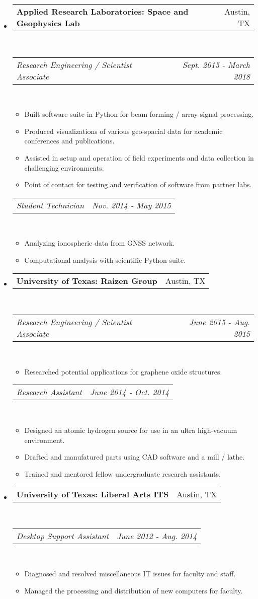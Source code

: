 \documentclass{article}
\makeatletter
\newcommand{\subheading}[2]{
	\begin{tabular*}{\textwidth-\leftmargin}{l@{\extracolsep{\fill}}r}
		\textbf{#1} & #2 \\
	\end{tabular*} \\
}
\newcommand{\itemheading}[2]{
	\vspace{1pt}
	\begin{tabular*}{\textwidth-\leftmargin}{l@{\extracolsep{\fill}}r}
		\textit{#1} & \textit{#2} \\
	\end{tabular*} \\
	\vspace{-2pt}
}
\makeatother
\begin{document}
\begin{itemize}
\item
	\subheading{Applied Research Laboratories: Space and Geophysics Lab}{Austin, TX}
	\itemheading{Research Engineering / Scientist Associate}{Sept. 2015 - March 2018}
	\begin{itemize}
	    \item Built software suite in Python for beam-forming / array signal processing.
		\item Produced visualizations of various geo-spacial data for academic conferences and publications.
    	\item Assisted in setup and operation of field experiments and data collection in challenging environments.
		\item Point of contact for testing and verification of software from partner labs.
	\end{itemize}
	\itemheading{Student Technician}{Nov. 2014 - May 2015}
	\begin{itemize}
    	\item Analyzing ionospheric data from GNSS network.
		\item Computational analysis with scientific Python suite.
	\end{itemize}

\item
	\subheading{University of Texas: Raizen Group}{Austin, TX}
	\itemheading{Research Engineering / Scientist Associate}{June 2015 - Aug. 2015}
	\begin{itemize}
    	\item Researched potential applications for graphene oxide structures.
	\end{itemize}
	\itemheading{Research Assistant}{June 2014 - Oct. 2014}
	\begin{itemize}
    	\item Designed an atomic hydrogen source for use in an ultra high-vacuum environment.
		\item Drafted and manufatured parts using CAD software and a mill / lathe.
    	\item Trained and mentored fellow undergraduate research assistants.
	\end{itemize}

\item
	\subheading{University of Texas: Liberal Arts ITS}{Austin, TX}
	\itemheading{Desktop Support Assistant}{June 2012 - Aug. 2014}
	\begin{itemize}
		\item Diagnosed and resolved miscellaneous IT issues for faculty and staff.
		\item Managed the processing and distribution of new computers for faculty.
	\end{itemize}
\end{itemize}
\end{document}
